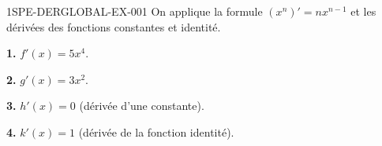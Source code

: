 \begin{corrige}{1SPE-DERGLOBAL-EX-001}
On applique la formule $(x^n)' = nx^{n-1}$ et les dérivées des fonctions constantes et identité.

\textbf{1.} $f'(x) = 5x^4$.

\textbf{2.} $g'(x) = 3x^2$.

\textbf{3.} $h'(x) = 0$ (dérivée d'une constante).

\textbf{4.} $k'(x) = 1$ (dérivée de la fonction identité).
\end{corrige}
